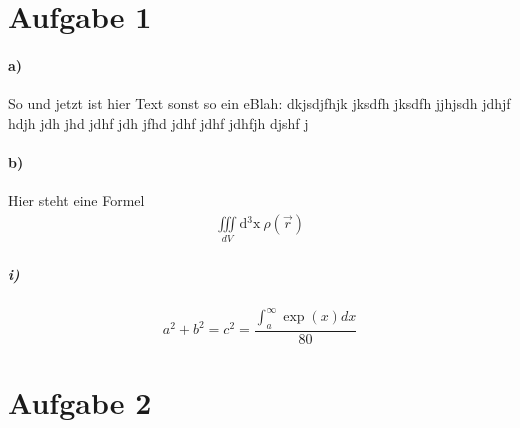 \documentclass[11pt, a4paper]{scrartcl} %
\theoremstyle{plain}
\theoremstyle{definition}
\newcommand{\Aufgabe}[1]{\section*{Aufgabe #1}}
\newcommand{\Unteraufgabe}[1]{\paragraph*{#1)}}
\newcommand{\Unterunteraufgabe}[1]{\subparagraph*{#1)}}
\begin{document}
	\Aufgabe{1}
	\Unteraufgabe{a}
	So und jetzt ist hier Text sonst so ein eBlah: dkjsdjfhjk jksdfh jksdfh jjhjsdh jdhjf hdjh jdh jhd jdhf jdh jfhd jdhf jdhf jdhfjh djshf j
	\Unteraufgabe{b} 
	Hier steht eine Formel
	\begin{align*}
		\underset{dV}{\iiint} \text{d$^3$x} ~ \rho(\vec{r})
	\end{align*}
	\Unterunteraufgabe{i}
	\begin{equation}
		a^2+b^2=c^2=\frac{\int_a^\infty\exp(x)dx}{80}
	\end{equation}
	
	\newpage 
	\Aufgabe{2}
	
\end{document}
